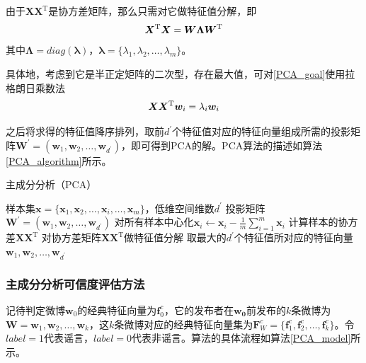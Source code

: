 \documentclass[a4paper,AutoFakeBold,oneside,12pt]{book}
\begin{document}
{{由于$\bm{X}\bm{X}^ \mathrm{ T }$是协方差矩阵，那么只需对它做特征值分解，即
\begin{equation}
\label{PCA_eigenvalue}
\bm{X}^ \mathrm{ T }\bm{X} = \bm{W}\bm{\Lambda}\bm{W}^ \mathrm{ T } \\
\end{equation}
其中$\bm{\Lambda}=diag(\bm{\lambda})$，$\bm{\lambda} = \{\lambda_1,\lambda_2,\ldots,\lambda_m\}$。

具体地，考虑到它是半正定矩阵的二次型，存在最大值，可对\eqref{PCA_goal}使用拉格朗日乘数法
\begin{equation}
\bm{X}\bm{X}^ \mathrm{ T }\bm{w}_i  = \lambda_i \bm{w}_i \\
\end{equation}

之后将求得的特征值降序排列，取前$d^\prime$个特征值对应的特征向量组成所需的投影矩阵$\bm{W}^\prime =(\bm{w}_1,\bm{w}_2,\ldots,\bm{w}_{d^\prime})$，即可得到PCA的解。PCA算法的描述如算法\ref{PCA_algorithm}所示。
\begin{algorithm} 
\caption{主成分分析（PCA）} 
\label{PCA_algorithm}
\renewcommand{\algorithmicrequire}{\textbf{输入：}}
\renewcommand{\algorithmicensure}{\textbf{输出：}} 
\begin{algorithmic}[1] 
\Require 样本集$\bm{x}=\{\bm{x}_1,\bm{x}_2,\ldots,\bm{x}_i,\ldots,\bm{x}_m\}$，低维空间维数$d^\prime$ 
\Ensure 投影矩阵  $\bm{W}^\prime =(\bm{w}_1,\bm{w}_2,\ldots,\bm{w}_{d^\prime})$
\State 对所有样本中心化$\bm{x}_i \gets \bm{x}_i - \frac{1}{m}\sum_{i=1}^m \bm{x}_i$
\State  计算样本的协方差$\bm{X}\bm{X}^ \mathrm{T}$
\State 对协方差矩阵$\bm{X}\bm{X}^ \mathrm{T}$做特征值分解
\State 取最大的$d^\prime$个特征值所对应的特征向量$\bm{w}_1,\bm{w}_2,\ldots,\bm{w}_{d^\prime}$
\end{algorithmic}  
\end{algorithm}

\subsubsection{主成分分析可信度评估方法}
记待判定微博$\bm{w}_0$的经典特征向量为$\bm{f}^{c}_{0}$，它的发布者在$\bm{w_0}$前发布的$k$条微博为$\bm{W} = \bm{w}_1,\bm{w}_2,\ldots,\bm{w}_k$，这$k$条微博对应的经典特征向量集为$\bm{F}^{c}_{W} = \{ \bm{f}^{c}_{1},\bm{f}^{c}_{2},\ldots,\bm{f}^{c}_{k} \}$。令$label = 1$代表谣言，$label = 0$代表非谣言。算法的具体流程如算法\ref{PCA_model}所示。

}}
\end{document}
